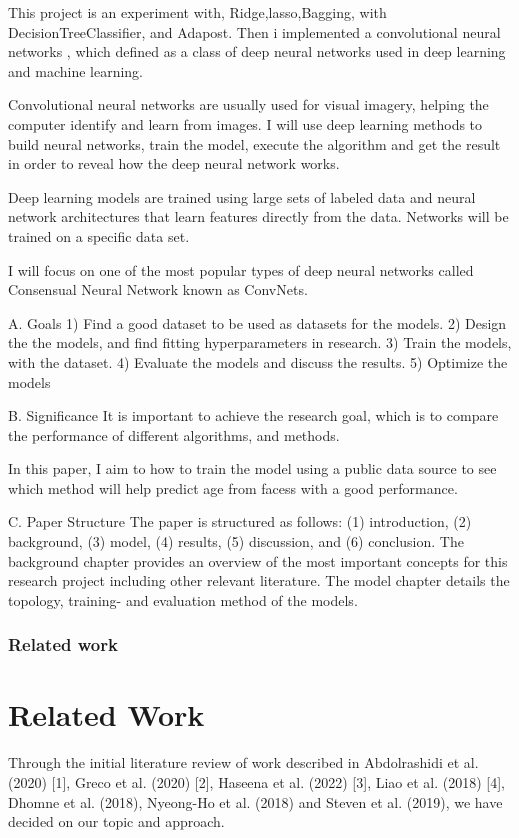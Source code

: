 \begin{introduction}
This project is an experiment with, Ridge,lasso,Bagging, with DecisionTreeClassifier, and Adapost. Then i implemented a  
convolutional neural networks , which defined as a class of deep neural networks used in deep learning and machine learning.

Convolutional neural networks are usually used for visual imagery, helping the computer identify and learn from images. 
I will use deep learning methods to build neural networks, train the model, execute the algorithm and get the result in order to reveal how the deep neural network works.

Deep learning models are trained using large sets of labeled data and neural network architectures that learn features directly from the data. Networks will be trained on a specific data set.

I will focus on one of the most popular types of deep neural networks called Consensual Neural Network known as ConvNets.

\hfill \break
\hfill \break

A. Goals
1) Find a good dataset to be used as  datasets for the models.
2) Design the the models, and find fitting hyperparameters in research.
3) Train the models, with the dataset.
4) Evaluate the models and discuss the results.
5) Optimize the models

B. Significance
It is important to achieve the research goal, which is to compare the performance of different algorithms, and methods.

In this paper, I aim to how to train the model using a public data source to see which method will help predict age from facess with a good performance.


C. Paper Structure
The paper is structured as follows: (1) introduction, (2)
background, (3) model, (4) results, (5) discussion, and (6) conclusion. The background chapter provides
an overview of the most important concepts for this research
project including other relevant literature. The model chapter
details the topology, training- and evaluation method of the
models. 


\subsubsection{Related work}
\section{Related Work}
Through the initial literature review of work described in Abdolrashidi et al. (2020) [1],
Greco et al. (2020) [2], Haseena et al. (2022) [3], Liao et al. (2018) [4], Dhomne et al. (2018),
Nyeong-Ho et al. (2018) and Steven et al. (2019), we have decided on our topic and approach.


\end{introduction}
